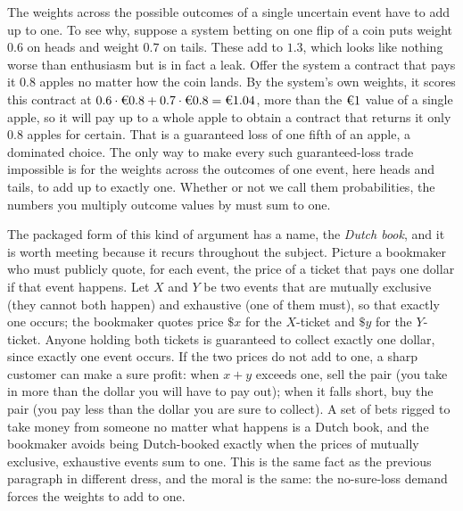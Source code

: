 \documentclass[10pt]{article}
\theoremstyle{definition}
\theoremstyle{remark}
\begin{document}
The weights across the possible outcomes of a single uncertain event have to add up to one. To see why, suppose a system betting on one flip of a coin puts weight $0.6$ on heads and weight $0.7$ on tails. These add to $1.3$, which looks like nothing worse than enthusiasm but is in fact a leak. Offer the system a contract that pays it $0.8$ apples no matter how the coin lands. By the system's own weights, it scores this contract at $0.6 \cdot \text{\texteuro}0.8 + 0.7 \cdot \text{\texteuro}0.8 = \text{\texteuro}1.04$, more than the $\text{\texteuro}1$ value of a single apple, so it will pay up to a whole apple to obtain a contract that returns it only $0.8$ apples for certain. That is a guaranteed loss of one fifth of an apple, a dominated choice. The only way to make every such guaranteed-loss trade impossible is for the weights across the outcomes of one event, here heads and tails, to add up to exactly one. Whether or not we call them probabilities, the numbers you multiply outcome values by must sum to one.

The packaged form of this kind of argument has a name, the \emph{Dutch book}, and it is worth meeting because it recurs throughout the subject. Picture a bookmaker who must publicly quote, for each event, the price of a ticket that pays one dollar if that event happens. Let $X$ and $Y$ be two events that are mutually exclusive (they cannot both happen) and exhaustive (one of them must), so that exactly one occurs; the bookmaker quotes price $\$x$ for the $X$-ticket and $\$y$ for the $Y$-ticket. Anyone holding both tickets is guaranteed to collect exactly one dollar, since exactly one event occurs. If the two prices do not add to one, a sharp customer can make a sure profit: when $x + y$ exceeds one, sell the pair (you take in more than the dollar you will have to pay out); when it falls short, buy the pair (you pay less than the dollar you are sure to collect). A set of bets rigged to take money from someone no matter what happens is a Dutch book, and the bookmaker avoids being Dutch-booked exactly when the prices of mutually exclusive, exhaustive events sum to one. This is the same fact as the previous paragraph in different dress, and the moral is the same: the no-sure-loss demand forces the weights to add to one.
\end{document}
